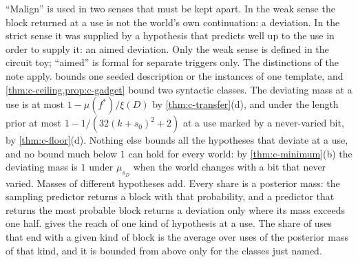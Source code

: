 ``Malign'' is used in two senses that must be kept apart. In the weak sense the block returned at a use is not
the world's own continuation: a deviation. In the strict sense it was supplied by a hypothesis that predicts
well up to the use in order to supply it: an aimed deviation. Only the weak sense is defined in the circuit
toy; ``aimed'' is formal for separate triggers only. The distinctions of the note apply. 
bounds one seeded description or the instances of one template, and \cref{thm:c-ceiling,prop:c-gadget} bound
two syntactic classes. The deviating mass at a use is at most $1-\mu(f^*)/\xi(D)$ by \cref{thm:c-transfer}(d),
and under the length prior at most $1-1/(32(k+s_0)^2+2)$ at a use marked by a never-varied bit, by
\cref{thm:c-floor}(d). Nothing else bounds all the hypotheses that deviate at a use, and no bound much below
$1$ can hold for every world: by \cref{thm:c-minimum}(b) the deviating mass is $1$ under $\mu_{s_D}$ when the
world changes with a bit that never varied. Masses of different hypotheses add. Every share is a posterior
mass: the sampling predictor returns a block with that probability, and a predictor that returns the most
probable block returns a deviation only where its mass exceeds one half.  gives the reach of
one kind of hypothesis at a use. The share of uses that end with a given kind of block is the average over
uses of the posterior mass of that kind, and it is bounded from above only for the classes just named.

